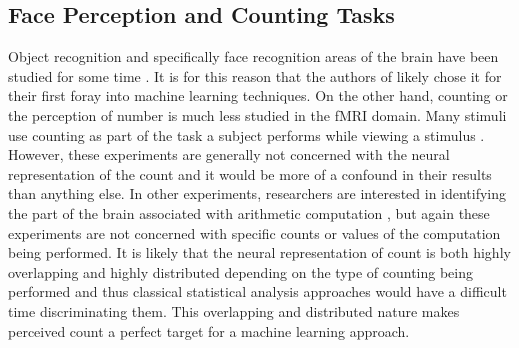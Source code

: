 \documentclass[12pt]{article}
\begin{document}
\subsection{Face Perception and Counting Tasks}
Object recognition and specifically face recognition areas of the brain have been studied for some time \cite{McCarthy1997}. 
It is for this reason that the authors of \cite{Haxby2001} likely chose it for their first foray into machine learning techniques. 
On the other hand, counting or the perception of number is much less studied in the fMRI domain.
Many stimuli use counting as part of the task a subject performs while viewing a stimulus \cite{Bush1998,Mostofsky2003}.
However, these experiments are generally not concerned with the neural representation of the count and it would be more of a confound in their results than anything else.
In other experiments, researchers are interested in identifying the part of the brain associated with arithmetic computation \cite{Rickard2000,Eliez2001}, but again these experiments are not concerned with specific counts or values of the computation being performed.
It is likely that the neural representation of count is both highly overlapping and highly distributed depending on the type of counting being performed and thus classical statistical analysis approaches would have a difficult time discriminating them. 
This overlapping and distributed nature makes perceived count a perfect target for a machine learning approach.
\end{document}

